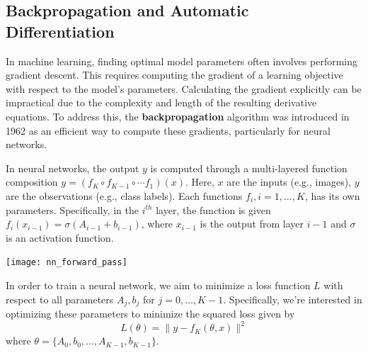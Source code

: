\documentclass{article}
\begin{document}
\subsection{Backpropagation and Automatic Differentiation}
In machine learning, finding optimal model parameters often involves
performing gradient descent. This requires computing the gradient of a
learning objective with respect to the model's parameters. Calculating the
gradient explicitly can be impractical due to the complexity and length of the
resulting derivative equations. To address this, the \textbf{backpropagation} algorithm
was introduced in 1962 as an efficient way to compute these gradients,
particularly for neural networks.

In neural networks, the output $y$ is computed through a multi-layered
function composition $y=(f_K\circ f_{K-1}\circ \cdots f_1)(x)$. Here, $x$ are
the inputs (e.g., images), $y$ are the observations (e.g., class labels).
Each functions $f_i,i=1,\ldots,K$, has its own parameters.
Specifically, in the $i^{th}$ layer, the function is given
$f_i(x_{i-1})=\sigma(A_{i-1}+b_{i-1})$, where $x_{i-1}$ is
the output from layer $i-1$ and $\sigma$ is an activation function. 
\begin{center}
    \texttt{[image: nn\_forward\_pass]}
\end{center}
In order to train a neural network, we aim to minimize a loss function $L$
with respect to all parameters $A_j,b_j$ for $j=0,\ldots,K-1$.
Specifically, we're interested in optimizing these parameters to minimize the
squared loss given by
$$L(\theta)=\lVert y-f_K(\theta,x)\rVert^2$$
where $\theta=\{A_0, b_0, \ldots,A_{K-1},b_{K-1}\}$.
\end{document}
